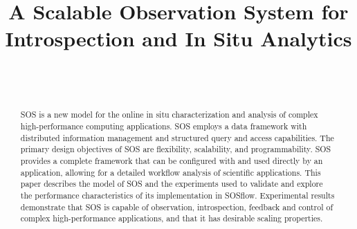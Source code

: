 
\title{A Scalable Observation System for Introspection and In Situ Analytics}

\author{
        \\
        \\
}

\maketitle



\begin{abstract} %
SOS is a new model for the online in situ characterization and
analysis of complex high-performance computing applications.
%
SOS employs a data framework with distributed information management
and structured query and access capabilities.
%
The primary design objectives of SOS are flexibility, scalability, and
programmability.
%
SOS provides a complete framework that can be configured with and
used directly by an application, allowing for a detailed workflow
analysis of scientific applications.
%
This paper describes the model of SOS and the experiments used to
validate and explore the performance characteristics of its
implementation in SOSflow.
%
Experimental results demonstrate that SOS is capable of observation,
introspection, feedback and control of complex high-performance
applications, and that it has desirable scaling properties.
%
%


\end{abstract}


